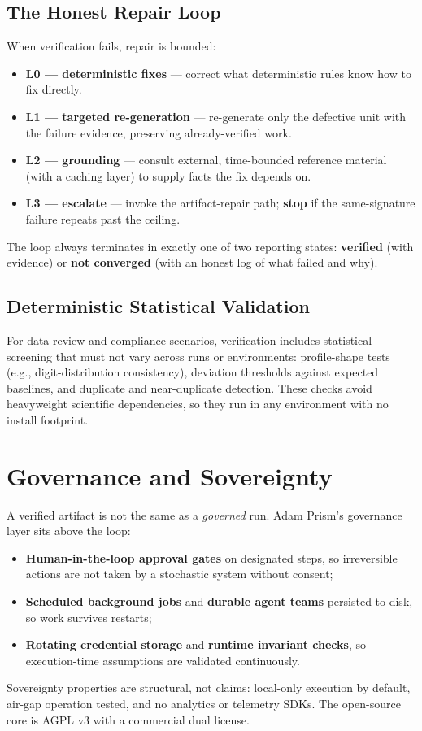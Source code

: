 \documentclass[11pt]{article}
\begin{document}
\subsection{The Honest Repair Loop}
When verification fails, repair is bounded:
\begin{itemize}
  \item \textbf{L0 --- deterministic fixes} --- correct what deterministic rules know how
        to fix directly.
  \item \textbf{L1 --- targeted re-generation} --- re-generate only the defective unit
        with the failure evidence, preserving already-verified work.
  \item \textbf{L2 --- grounding} --- consult external, time-bounded reference material
        (with a caching layer) to supply facts the fix depends on.
  \item \textbf{L3 --- escalate} --- invoke the artifact-repair path; \textbf{stop} if the
        same-signature failure repeats past the ceiling.
\end{itemize}
The loop always terminates in exactly one of two reporting states: \textbf{verified}
(with evidence) or \textbf{not converged} (with an honest log of what failed and why).

\subsection{Deterministic Statistical Validation}
For data-review and compliance scenarios, verification includes statistical screening that
must not vary across runs or environments: profile-shape tests (e.g., digit-distribution
consistency), deviation thresholds against expected baselines, and duplicate and
near-duplicate detection. These checks avoid heavyweight scientific dependencies, so they
run in any environment with no install footprint.

\section{Governance and Sovereignty}\label{sec:governance}
A verified artifact is not the same as a \emph{governed} run. Adam Prism's governance
layer sits above the loop:
\begin{itemize}
  \item \textbf{Human-in-the-loop approval gates} on designated steps, so irreversible
        actions are not taken by a stochastic system without consent;
  \item \textbf{Scheduled background jobs} and \textbf{durable agent teams} persisted to
        disk, so work survives restarts;
  \item \textbf{Rotating credential storage} and \textbf{runtime invariant checks}, so
        execution-time assumptions are validated continuously.
\end{itemize}
Sovereignty properties are structural, not claims: local-only execution by default,
air-gap operation tested, and no analytics or telemetry SDKs. The open-source core is
AGPL v3 with a commercial dual license.
\end{document}
